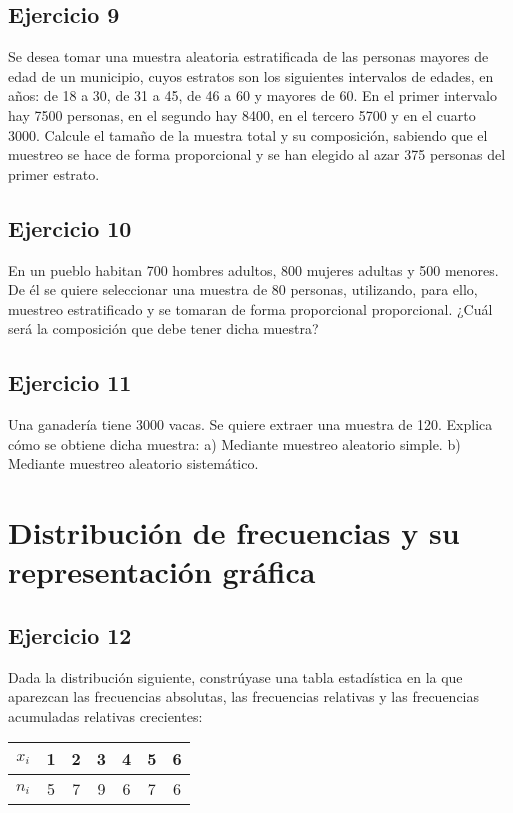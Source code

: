 \documentclass[11pt,letterpaper]{report}
\begin{document}
      \subsection*{Ejercicio 9}
        Se desea tomar una muestra aleatoria estratificada de las personas mayores de edad de un municipio, cuyos estratos son los siguientes intervalos de edades, en años: de 18 a 30, de 31 a 45, de 46 a 60 y mayores de 60. En el primer intervalo hay 7500 personas, en el segundo hay 8400, en el tercero 5700 y en el cuarto 3000. Calcule el tamaño de la muestra total y su composición, sabiendo que el muestreo se hace de forma proporcional y se han elegido al azar 375 personas del primer estrato.
      \subsection*{Ejercicio 10}
        En un pueblo habitan 700 hombres adultos, 800 mujeres adultas y 500 menores. De él se quiere seleccionar una muestra de 80 personas, utilizando, para ello, muestreo estratificado y se  tomaran de forma proporcional proporcional. ¿Cuál será la composición que debe tener dicha muestra?
      \subsection*{Ejercicio 11}
        Una ganadería tiene 3000 vacas. Se quiere extraer una muestra de 120. Explica cómo se obtiene
        dicha muestra:
        a) Mediante muestreo aleatorio simple.
        b) Mediante muestreo aleatorio sistemático.
    \section{Distribución de frecuencias y su representación gráfica}
      \subsection*{Ejercicio 12}
        Dada la distribución siguiente, constrúyase una tabla estadística en la que aparezcan las frecuencias absolutas, las frecuencias relativas y las frecuencias acumuladas relativas crecientes:
        \begin{table}[!h]
          \centering
          \begin{tabular}{|c|cccccc|}
              \hline
              $x_i$ & 1 & 2 & 3 & 4 & 5 & 6  \\
              \hline
              $n_i$ & 5 & 7 & 9 & 6 & 7 & 6  \\
              \hline
          \end{tabular}
        \end{table}
\end{document}
